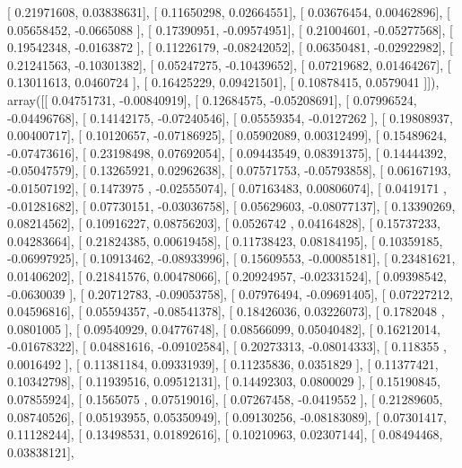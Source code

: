 \documentclass{article}
\begin{document}
       [ 0.21971608,  0.03838631],
       [ 0.11650298,  0.02664551],
       [ 0.03676454,  0.00462896],
       [ 0.05658452, -0.0665088 ],
       [ 0.17390951, -0.09574951],
       [ 0.21004601, -0.05277568],
       [ 0.19542348, -0.0163872 ],
       [ 0.11226179, -0.08242052],
       [ 0.06350481, -0.02922982],
       [ 0.21241563, -0.10301382],
       [ 0.05247275, -0.10439652],
       [ 0.07219682,  0.01464267],
       [ 0.13011613,  0.0460724 ],
       [ 0.16425229,  0.09421501],
       [ 0.10878415,  0.0579041 ]]), array([[ 0.04751731, -0.00840919],
       [ 0.12684575, -0.05208691],
       [ 0.07996524, -0.04496768],
       [ 0.14142175, -0.07240546],
       [ 0.05559354, -0.0127262 ],
       [ 0.19808937,  0.00400717],
       [ 0.10120657, -0.07186925],
       [ 0.05902089,  0.00312499],
       [ 0.15489624, -0.07473616],
       [ 0.23198498,  0.07692054],
       [ 0.09443549,  0.08391375],
       [ 0.14444392, -0.05047579],
       [ 0.13265921,  0.02962638],
       [ 0.07571753, -0.05793858],
       [ 0.06167193, -0.01507192],
       [ 0.1473975 , -0.02555074],
       [ 0.07163483,  0.00806074],
       [ 0.0419171 , -0.01281682],
       [ 0.07730151, -0.03036758],
       [ 0.05629603, -0.08077137],
       [ 0.13390269,  0.08214562],
       [ 0.10916227,  0.08756203],
       [ 0.0526742 ,  0.04164828],
       [ 0.15737233,  0.04283664],
       [ 0.21824385,  0.00619458],
       [ 0.11738423,  0.08184195],
       [ 0.10359185, -0.06997925],
       [ 0.10913462, -0.08933996],
       [ 0.15609553, -0.00085181],
       [ 0.23481621,  0.01406202],
       [ 0.21841576,  0.00478066],
       [ 0.20924957, -0.02331524],
       [ 0.09398542, -0.0630039 ],
       [ 0.20712783, -0.09053758],
       [ 0.07976494, -0.09691405],
       [ 0.07227212,  0.04596816],
       [ 0.05594357, -0.08541378],
       [ 0.18426036,  0.03226073],
       [ 0.1782048 ,  0.0801005 ],
       [ 0.09540929,  0.04776748],
       [ 0.08566099,  0.05040482],
       [ 0.16212014, -0.01678322],
       [ 0.04881616, -0.09102584],
       [ 0.20273313, -0.08014333],
       [ 0.118355  ,  0.0016492 ],
       [ 0.11381184,  0.09331939],
       [ 0.11235836,  0.0351829 ],
       [ 0.11377421,  0.10342798],
       [ 0.11939516,  0.09512131],
       [ 0.14492303,  0.0800029 ],
       [ 0.15190845,  0.07855924],
       [ 0.1565075 ,  0.07519016],
       [ 0.07267458, -0.0419552 ],
       [ 0.21289605,  0.08740526],
       [ 0.05193955,  0.05350949],
       [ 0.09130256, -0.08183089],
       [ 0.07301417,  0.11128244],
       [ 0.13498531,  0.01892616],
       [ 0.10210963,  0.02307144],
       [ 0.08494468,  0.03838121],
\end{document}
